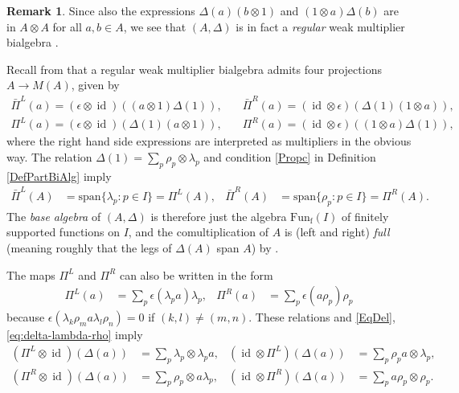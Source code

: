 \documentclass[10pt]{article}
\DeclareMathOperator{\fin}{\mathrm{f}}
\DeclareMathOperator{\id}{id}
\newcommand{\Fun}{\mathrm{Fun}}
\theoremstyle{definition}
\newtheorem{Rem}[Theorem]{Remark}
\numberwithin{equation}{section}
\begin{document}
\begin{Rem} 
Since also the expressions $\Delta(a)(b\otimes 1)$ and $(1\otimes a)\Delta(b)$ are in $A\otimes A$ for all $a,b\in A$, we see that $(A,\Delta)$ is in fact a \emph{regular} weak multiplier bialgebra \cite[Definition 2.3]{Boh1}.
\end{Rem} 

Recall from \cite[Section 3]{Boh1} that a regular weak multiplier
bialgebra admits four projections $A\rightarrow M(A)$, given
by \begin{align*} \bar{\Pi}^L(a) = (\epsilon\otimes \id)((a\otimes
  1)\Delta(1)),\quad & \bar{\Pi}^R(a) = (\id\otimes
  \epsilon)(\Delta(1)(1\otimes a)),\\ \Pi^L(a) = (\epsilon\otimes
  \id)(\Delta(1)(a\otimes 1)),\quad& \Pi^R(a) =
  (\id\otimes\epsilon)((1\otimes a)\Delta(1)),\end{align*} where the
right hand side expressions are interpreted as multipliers in the
obvious way. The relation  $\Delta(1)=\sum_{p} \rho_{p} \otimes \lambda_{p}$ and  condition \ref{Propc} in Definition \ref{DefPartBiAlg} imply
\begin{align*}
  \bar \Pi^{L}(A) &=\mathrm{span}\{\lambda_{p}:p\in I\} =  \Pi^{L}(A), &
  \bar \Pi^{R}(A) &= \mathrm{span}\{\rho_{p}:p\in I\} =\Pi^{R}(A).
\end{align*}
The \emph{base algebra} of $(A,\Delta)$ is therefore just the algebra
$\Fun_{\fin}(I)$ of finitely supported functions on $I$, and the
comultiplication of $A$ is (left and right) \emph{full} (meaning
roughly that the legs of $\Delta(A)$ span $A$) by \cite[Theorem 3.13]{Boh1}.  

 The maps $\Pi^{L}$ and $\Pi^{R}$ can also
be written in the form
\begin{align} \label{eq:pi} 
    \Pi^L(a) & = \sum_{p}\epsilon(\lambda_{p}a)\lambda_p, & \Pi^R(a) & =    \sum_{p}\epsilon(a \rho_{p}) \rho_p
\end{align}
because $\epsilon(\lambda_{k}\rho_{m} a \lambda_{l}\rho_{n})=0$  if $(k,l)\neq(m,n)$. These relations and  \eqref{EqDel}, \eqref{eq:delta-lambda-rho} imply
\begin{align} \label{eq:pi-l-delta}
  (\Pi^{L} \otimes \id)(\Delta(a)) &= \sum_{p} \lambda_{p}\otimes \lambda_{p}a, &
  (\id \otimes \Pi^{L})(\Delta(a)) &= \sum_{p} \rho_{p}a \otimes \lambda_{p}, & \\ \label{eq:pi-r-delta}
  (\Pi^{R} \otimes \id)(\Delta(a)) &= \sum_{p} \rho_{p} \otimes a\lambda_{p}, &
  (\id \otimes \Pi^{R})(\Delta(a)) &= \sum_{p} a\rho_{p} \otimes \rho_{p}.
\end{align}
\end{document}
